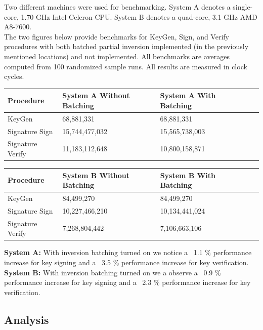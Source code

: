 Two different machines were used for benchmarking. System A denotes a single-core, 1.70 GHz Intel Celeron CPU. System B denotes a quad-core, 3.1 GHz AMD A8-7600.\\

The two figures below provide benchmarks for KeyGen, Sign, and Verify procedures with both batched partial inversion implemented (in the previously mentioned locations) and not implemented. All benchmarks are averages computed from 100 randomized sample runs. All results are measured in clock cycles.

\begin{center}
\begin{tabular}{@{}lllll@{}}
	\toprule
	Procedure & System A Without Batching & System A With Batching\\
	\midrule
	KeyGen & 68,881,331 & 68,881,331\\
	Signature Sign & 15,744,477,032 & 15,565,738,003\\
	Signature Verify & 11,183,112,648 & 10,800,158,871\\
	\bottomrule
\end{tabular}
\end{center}

\begin{center}
\begin{tabular}{@{}lllll@{}}
	\toprule
	Procedure & System B Without Batching & System B With Batching\\
	\midrule
	KeyGen & 84,499,270 & 84,499,270\\
	Signature Sign & 10,227,466,210 & 10,134,441,024\\
	Signature Verify & 7,268,804,442 & 7,106,663,106\\
	\bottomrule
\end{tabular}
\end{center}

\textbf{System A:} With inversion batching turned on we notice a ~1.1 \% performance increase for key signing and a ~3.5 \% performance increase for key verification.\\

\textbf{System B:} With inversion batching turned on we a observe a ~0.9 \% performance increase for key signing and a ~2.3 \% performance increase for key verification.\\

\subsection{Analysis}


